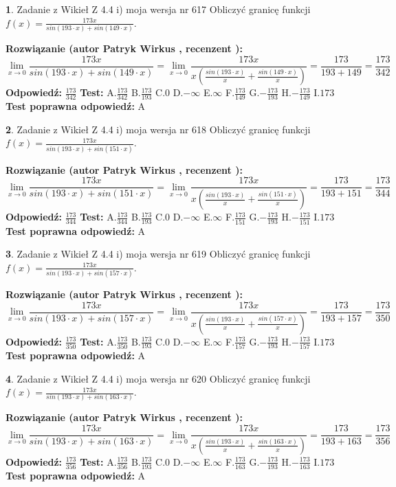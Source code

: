 \documentclass[12pt, a4paper]{article}
\theoremstyle{definition} %
\newtheorem{zad}{}
\newcommand{\zadStart}[1]{\begin{zad}#1\newline}
\newcommand{\zadStop}{\end{zad}}
\newcommand{\rozwStart}[2]{\noindent \textbf{Rozwiązanie (autor #1 , recenzent #2): }\newline}
\newcommand{\rozwStop}{\newline}
\newcommand{\odpStart}{\noindent \textbf{Odpowiedź:}\newline}
\newcommand{\odpStop}{\newline}
\newcommand{\testStart}{\noindent \textbf{Test:}\newline}
\newcommand{\testStop}{\newline}
\newcommand{\kluczStart}{\noindent \textbf{Test poprawna odpowiedź:}\newline}
\newcommand{\kluczStop}{\newline}
\begin{document}
\zadStart{Zadanie z Wikieł Z 4.4 i) moja wersja nr 617}
Obliczyć granicę funkcji $f(x)=\frac{173x}{sin(193\cdot x) +sin(149\cdot x)}$.
\zadStop
\rozwStart{Patryk Wirkus}{}
$$\lim\limits_{x\to 0}\frac{173x}{sin(193\cdot x) +sin(149\cdot x)}=\lim\limits_{x\to 0}\frac{173x}{x(\frac{sin(193\cdot x)}{x}+\frac{sin(149\cdot x)}{x})}=\frac{173}{193+149} = \frac{173}{342}$$
\rozwStop
\odpStart
$\frac{173}{342}$
\odpStop
\testStart
A.$\frac{173}{342}$
B.$\frac{173}{193}$
C.$0$
D.$-\infty$
E.$\infty$
F.$\frac{173}{149}$
G.$-\frac{173}{193}$
H.$-\frac{173}{149}$
I.$173$
\testStop
\kluczStart
A
\kluczStop



\zadStart{Zadanie z Wikieł Z 4.4 i) moja wersja nr 618}
Obliczyć granicę funkcji $f(x)=\frac{173x}{sin(193\cdot x) +sin(151\cdot x)}$.
\zadStop
\rozwStart{Patryk Wirkus}{}
$$\lim\limits_{x\to 0}\frac{173x}{sin(193\cdot x) +sin(151\cdot x)}=\lim\limits_{x\to 0}\frac{173x}{x(\frac{sin(193\cdot x)}{x}+\frac{sin(151\cdot x)}{x})}=\frac{173}{193+151} = \frac{173}{344}$$
\rozwStop
\odpStart
$\frac{173}{344}$
\odpStop
\testStart
A.$\frac{173}{344}$
B.$\frac{173}{193}$
C.$0$
D.$-\infty$
E.$\infty$
F.$\frac{173}{151}$
G.$-\frac{173}{193}$
H.$-\frac{173}{151}$
I.$173$
\testStop
\kluczStart
A
\kluczStop



\zadStart{Zadanie z Wikieł Z 4.4 i) moja wersja nr 619}
Obliczyć granicę funkcji $f(x)=\frac{173x}{sin(193\cdot x) +sin(157\cdot x)}$.
\zadStop
\rozwStart{Patryk Wirkus}{}
$$\lim\limits_{x\to 0}\frac{173x}{sin(193\cdot x) +sin(157\cdot x)}=\lim\limits_{x\to 0}\frac{173x}{x(\frac{sin(193\cdot x)}{x}+\frac{sin(157\cdot x)}{x})}=\frac{173}{193+157} = \frac{173}{350}$$
\rozwStop
\odpStart
$\frac{173}{350}$
\odpStop
\testStart
A.$\frac{173}{350}$
B.$\frac{173}{193}$
C.$0$
D.$-\infty$
E.$\infty$
F.$\frac{173}{157}$
G.$-\frac{173}{193}$
H.$-\frac{173}{157}$
I.$173$
\testStop
\kluczStart
A
\kluczStop



\zadStart{Zadanie z Wikieł Z 4.4 i) moja wersja nr 620}
Obliczyć granicę funkcji $f(x)=\frac{173x}{sin(193\cdot x) +sin(163\cdot x)}$.
\zadStop
\rozwStart{Patryk Wirkus}{}
$$\lim\limits_{x\to 0}\frac{173x}{sin(193\cdot x) +sin(163\cdot x)}=\lim\limits_{x\to 0}\frac{173x}{x(\frac{sin(193\cdot x)}{x}+\frac{sin(163\cdot x)}{x})}=\frac{173}{193+163} = \frac{173}{356}$$
\rozwStop
\odpStart
$\frac{173}{356}$
\odpStop
\testStart
A.$\frac{173}{356}$
B.$\frac{173}{193}$
C.$0$
D.$-\infty$
E.$\infty$
F.$\frac{173}{163}$
G.$-\frac{173}{193}$
H.$-\frac{173}{163}$
I.$173$
\testStop
\kluczStart
A
\kluczStop
\end{document}
